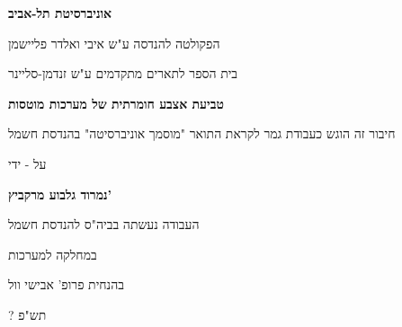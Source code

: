 \begin{otherlanguage}{hebrew}
\begin{titlepage}
\begin{center}
  \vspace*{1cm}
  
  \large
  \textbf{אוניברסיטת תל-אביב}
   
  \normalsize
  הפקולטה להנדסה ע"ש איבי ואלדר פליישמן
   
  בית הספר לתארים מתקדמים ע"ש זנדמן-סליינר
   
  \vspace{0.5cm}
  \Large
  \textbf{טביעת אצבע חומרתית של מערכות מוטסות}
  
  \vspace{0.5cm}
   
  \vspace{1cm}
  \normalsize
  חיבור זה הוגש כעבודת גמר לקראת התואר "מוסמך אוניברסיטה" בהנדסת חשמל
   
  \vspace{0.5cm}
  על - ידי
   
  \Large
  \textbf{נמרוד גלבוע מרקביץ'}
   
  \vspace{1 cm}
  \normalsize
  העבודה נעשתה בביה"ס להנדסת חשמל
  
  במחלקה למערכות
   
  בהנחית פרופ' אבישי וול
   
  \vspace{0.5cm}
  \large
  ? תש"פ
\end{center}
\end{titlepage}
\end{otherlanguage}
